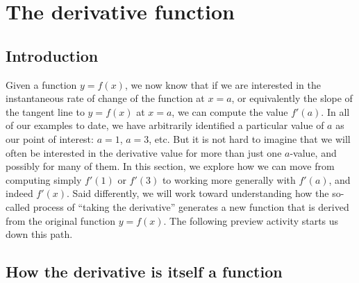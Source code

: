\section{The derivative function} \label{S:1.4.DerivativeFxn}

\vspace*{-14 pt}

\subsection*{Introduction}

Given a function $y = f(x)$, we now know that if we are interested in the instantaneous rate of change of the function at $x = a$, or equivalently the slope of the tangent line to $y = f(x)$ at $x = a$, we can compute the value $f'(a)$.  In all of our examples to date, we have arbitrarily identified a particular value of $a$ as our point of interest: $a = 1$, $a = 3$, etc.  But it is not hard to imagine that we will often be interested in the derivative value for more than just one $a$-value, and possibly for many of them.  In this section, we explore how we can move from computing simply $f'(1)$ or $f'(3)$ to working more generally with $f'(a)$, and indeed $f'(x)$.  Said differently, we will work toward understanding how the so-called process of ``taking the derivative'' generates a new function that is derived from the original function $y = f(x)$.  The following preview activity starts us down this path.



\subsection*{How the derivative is itself a function}

